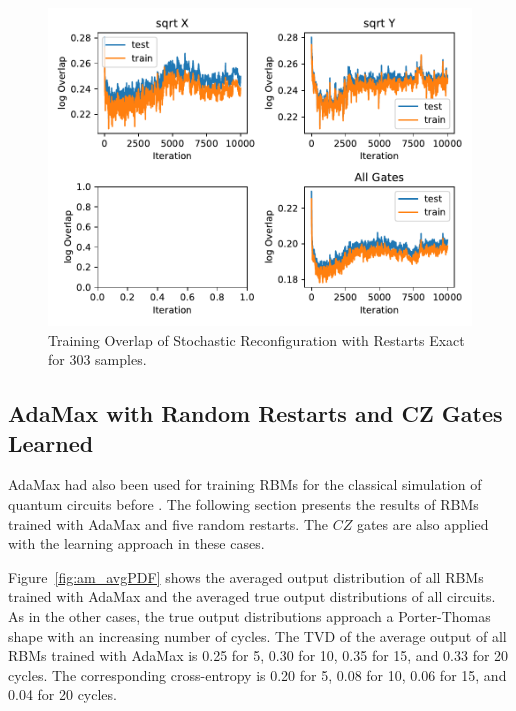 \begin{figure}[H]
  \centering
  \includegraphics[width=\textwidth]{figures/results/SR-restarts-not-learned/avgOverlap_303.pdf}
  \caption[Training Overlap of Stochastic Reconfiguration with Restarts Exact]{Training 
  Overlap of Stochastic Reconfiguration with Restarts Exact for 303 samples.}
  \label{fig:sr_exact_overlap_303}
\end{figure}

\newpage

\subsection{AdaMax with Random Restarts and CZ Gates Learned}

AdaMax had also been used for training RBMs for the 
classical simulation of quantum circuits before \cite{jnsson2018neuralnetwork}. The following section presents the results
of RBMs trained with AdaMax and five random restarts. The $CZ$ gates are also applied with the 
learning approach in these cases.

Figure~\ref{fig:am_avgPDF} shows the averaged output distribution of all RBMs trained with AdaMax and 
the averaged true output distributions of all circuits. As in the other cases, the 
true output distributions approach a Porter-Thomas shape with an increasing number of cycles.
The TVD of the average output of all RBMs trained with AdaMax
is 0.25 for 5, 0.30 for 10, 0.35 for 15, and 0.33 for 20 cycles. The corresponding cross-entropy is 
0.20 for 5, 0.08 for 10, 0.06 for 15, and 0.04 for 20 cycles.

